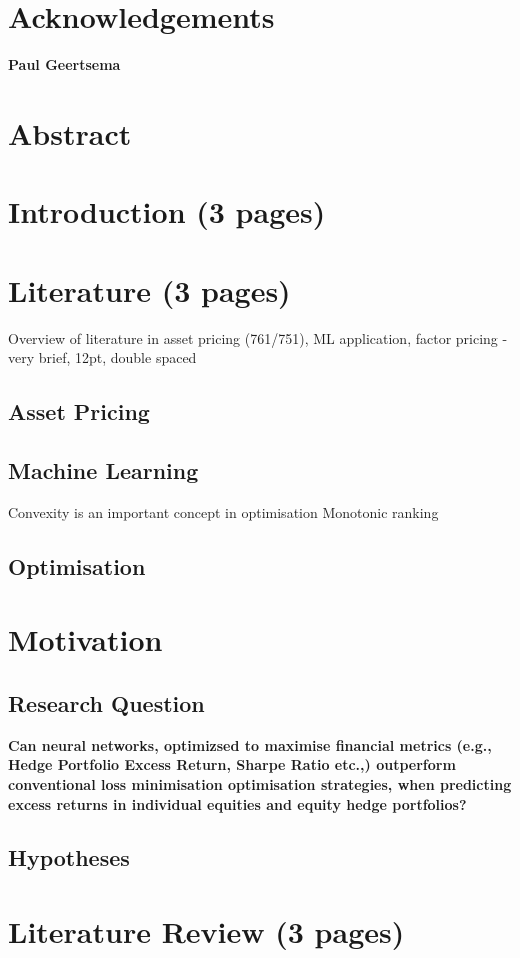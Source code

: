 \documentclass[12pt]{article}
\begin{document}
\section*{Acknowledgements}
\begin{center}
	\textbf{Paul Geertsema}
\end{center}
\newpage
\section*{Abstract}
\newpage
\tableofcontents
\listoffigures
\listoftables
\listofmyequations
\newpage
\section{Introduction (3 pages)}
\newpage
\section{Literature (3 pages)}\label{LR}
Overview of literature in asset pricing (761/751), ML application, factor pricing - very brief, 12pt, double spaced
\subsection{Asset Pricing}
\subsection{Machine Learning}
Convexity is an important concept in optimisation
Monotonic ranking
\subsection{Optimisation}
\newpage
\section{Motivation}
\subsection{Research Question}
\textbf{Can neural networks, optimizsed to maximise financial metrics (e.g., Hedge Portfolio Excess Return, Sharpe Ratio etc.,) outperform conventional loss minimisation optimisation strategies,
when predicting excess returns in individual equities and equity hedge portfolios?}
\subsection{Hypotheses}
\section{Literature Review (3 pages)}
\end{document}

